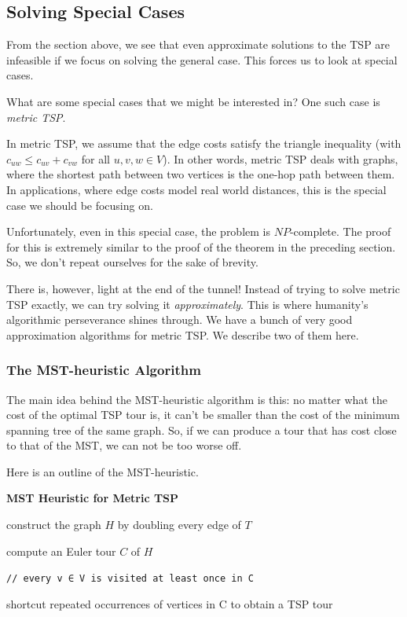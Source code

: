 \documentclass[12pt]{article}
\begin{document}
\subsection{Solving Special Cases}

From the section above, we see that even approximate solutions to the TSP are infeasible if we focus on solving the general case. This forces us to look at special cases.

What are some special cases that we might be interested in? One such case is \textit{metric TSP}. 

In metric TSP, we assume that the edge costs satisfy the triangle inequality (with \(c_{uw} \leq c_{uv}+c_{vw}\) for all \(u, v, w \in V\)). In other words, metric TSP deals with graphs, where the shortest path between two vertices is the one-hop path between them. In applications, where edge costs model real world distances, this is the special case we should be focusing on.

Unfortunately, even in this special case, the problem is \(NP\)-complete. The proof for this is extremely similar to the proof of the theorem in the preceding section. So, we don't repeat ourselves for the sake of brevity.

There is, however, light at the end of the tunnel! Instead of trying to solve metric TSP exactly, we can try solving it \textit{approximately}. This is where humanity's algorithmic perseverance shines through. We have a bunch of very good approximation algorithms for metric TSP. We describe two of them here.

\subsubsection{The MST-heuristic Algorithm}

The main idea behind the MST-heuristic algorithm is this: no matter what the cost of the optimal TSP tour is, it can't be smaller than the cost of the minimum spanning tree of the same graph. So, if we can produce a tour that has cost close to that of the MST, we can not be too worse off.

Here is an outline of the MST-heuristic.

\begin{center}
    \textbf{MST Heuristic for Metric TSP}
    \vspace{3mm}
    
    construct the graph \(H\) by doubling every edge of \(T\)
    
    compute an Euler tour \(C\) of \(H\)
    
    \texttt{// every v ∈ V is visited at least once in C}
    
    shortcut repeated occurrences of vertices in C to obtain a TSP tour
\end{center}
\end{document}
